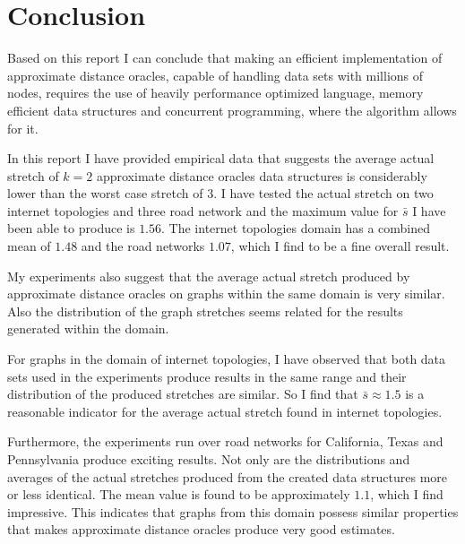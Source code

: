 \chapter{Conclusion}
\label{sec:conclusion}

Based on this report I can conclude that making an efficient implementation
of approximate distance oracles, capable of handling data sets with millions
of nodes, requires the use of heavily performance optimized language, memory
efficient data structures and concurrent programming, where the algorithm
allows for it.

In this report I have provided empirical data that suggests the average actual
stretch of $k=2$ approximate distance oracles data structures is considerably
lower than the worst case stretch of $3$. I have tested the actual stretch
on two internet topologies and three road network and the maximum value for
$\bar{s}$ I have been able to produce is $1.56$. The internet topologies
domain has a combined mean of $1.48$ and the road networks $1.07$, which I
find to be a fine overall result.

My experiments also suggest that the average actual stretch produced by
approximate distance oracles on graphs within the same domain is very similar.
Also the distribution of the graph stretches seems related for the results
generated within the domain.

For graphs in the domain of internet topologies, I have observed that both
data sets used in the experiments produce results in the same range and their
distribution of the produced stretches are similar. So I find that $\bar{s}
\approx 1.5$ is a reasonable indicator for the average actual stretch found in
internet topologies.

Furthermore, the experiments run over road networks for California, Texas and
Pennsylvania produce exciting results. Not only are the distributions and
averages of the actual stretches produced from the created data structures
more or less identical. The mean value is found to be approximately $1.1$,
which I find impressive. This indicates that graphs from this domain possess
similar properties that makes approximate distance oracles produce very good
estimates.
